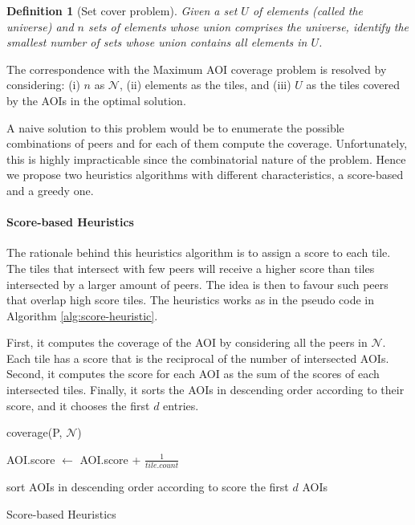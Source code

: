 \documentclass[final,10pt,a5paper]{phdimt}
\theoremstyle{definition}
\newtheorem{mydef}{Definition}
\begin{document}
\begin{mydef} 
[Set cover problem]  
\emph{Given a set $U$ of elements (called the universe) and $n$ sets of elements whose union comprises the universe, identify the smallest number of sets whose union contains all elements in $U$.}
\end{mydef}

The correspondence with the Maximum AOI coverage problem is resolved by considering: (i) $n$ as $\mathscr{N}$, (ii) elements as the tiles, and (iii) $U$ as the tiles covered by the AOIs in the optimal solution.


A naive solution to this problem would be to enumerate the possible combinations of peers and for each of them compute the coverage.
Unfortunately, this is highly impracticable since the combinatorial nature of the problem. 
Hence we propose two heuristics algorithms with different characteristics, a score-based and a greedy one.




\paragraph{Score-based Heuristics}
The rationale behind this heuristics algorithm is to assign a score to each tile. The tiles that intersect with few peers will receive a higher score than tiles intersected by a larger amount of peers. The idea is then to favour such peers that overlap high score tiles. The heuristics works as in the pseudo code in Algorithm \ref{alg:score-heuristic}. 

First, it computes the coverage of the AOI by considering all the peers in $\mathscr{N}$. 
Each tile has a score that is the reciprocal of the number of intersected AOIs.
Second, it computes the score for each AOI as the sum of the scores of each intersected tiles.
Finally, it sorts the AOIs in descending order according to their score, and it chooses the first $d$ entries.



\begin{algorithm}[tbh]

\BlankLine


coverage(P, $\mathscr{N}$)\;

{
  {
    {
      AOI.score $\leftarrow$ AOI.score + $\frac{1}{tile.count}$\;   
    }
  }
}

sort AOIs in descending order according to score\;
\Return the first $d$ AOIs\;

\caption{Score-based Heuristics}\label{alg:score-heuristic}
\end{algorithm}
\end{document}
